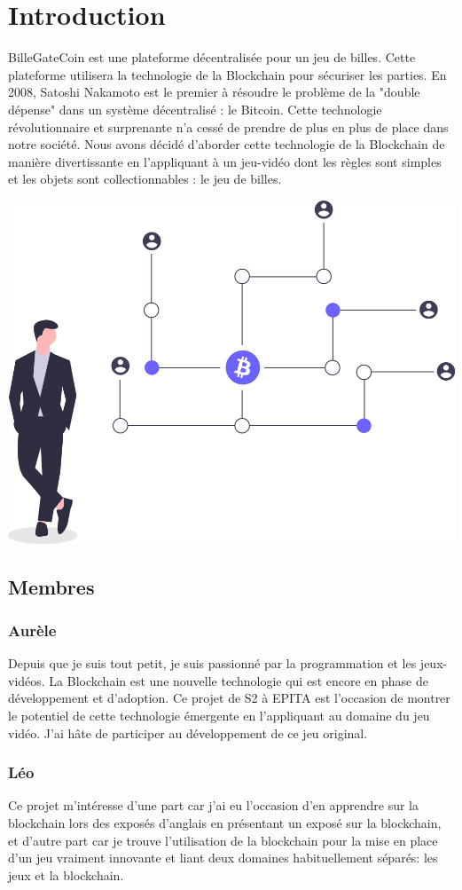 \documentclass{article}
\begin{document}
\section{Introduction}
BilleGateCoin est une plateforme décentralisée pour un jeu de billes. Cette plateforme utilisera la technologie de la Blockchain pour sécuriser les parties. En 2008, Satoshi Nakamoto est le premier à résoudre le problème de la "double dépense" dans un système décentralisé : le Bitcoin. Cette technologie révolutionnaire et surprenante n'a cessé de prendre de plus en plus de place dans notre société. Nous avons décidé d'aborder cette technologie de la Blockchain de manière divertissante en l'appliquant à un jeu-vidéo dont les règles sont simples et les objets sont collectionnables : le jeu de billes.

\includegraphics[width=0.3\linewidth]{assets/decentralized.png}\\

\subsection{Membres}
\subsubsection{Aurèle}
Depuis que je suis tout petit, je suis passionné par la programmation et les jeux-vidéos. La Blockchain est une nouvelle technologie qui est encore en phase de développement et d'adoption. Ce projet de S2 à EPITA est l'occasion de montrer le potentiel de cette technologie émergente en l'appliquant au domaine du jeu vidéo. J'ai hâte de participer au développement de ce jeu original.

\subsubsection{Léo}
Ce projet m'intéresse d'une part car j'ai eu l'occasion d'en apprendre sur la blockchain lors des exposés d'anglais en présentant un exposé sur la blockchain, et d'autre part car je trouve l'utilisation de la blockchain pour la mise en place d'un jeu vraiment innovante et liant deux domaines habituellement séparés: les jeux et la blockchain.
\end{document}
